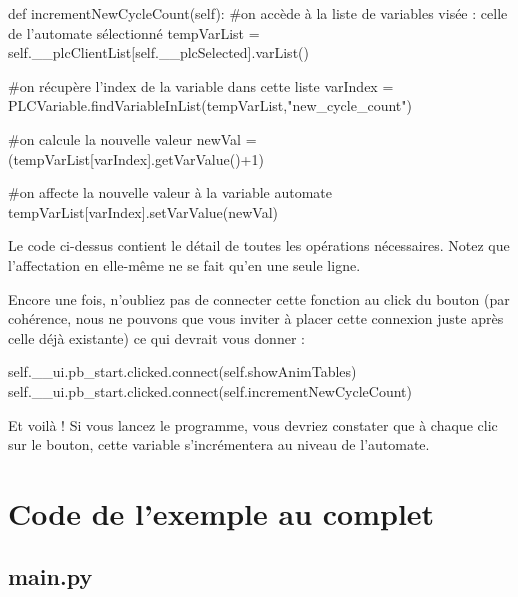 \begin{pyCode}
def incrementNewCycleCount(self):
	#on accède à la liste de variables visée : celle de l'automate sélectionné
	tempVarList = self.__plcClientList[self.__plcSelected].varList()

	#on récupère l'index de la variable dans cette liste
	varIndex = PLCVariable.findVariableInList(tempVarList,"new_cycle_count")

	#on calcule la nouvelle valeur
	newVal = (tempVarList[varIndex].getVarValue()+1)%

	#on affecte la nouvelle valeur à la variable automate
	tempVarList[varIndex].setVarValue(newVal)
\end{pyCode}
Le code ci-dessus contient le détail de toutes les opérations nécessaires.\newline
Notez que l'affectation en elle-même ne se fait qu'en une seule ligne.\smallSkip

Encore une fois, n'oubliez pas de connecter cette fonction au click du bouton (par cohérence, nous ne pouvons que vous inviter à placer cette connexion juste après celle déjà existante) ce qui devrait vous donner :
\begin{pyCode}
self.__ui.pb_start.clicked.connect(self.showAnimTables)
self.__ui.pb_start.clicked.connect(self.incrementNewCycleCount)
\end{pyCode}
\smallSkip

Et voilà ! Si vous lancez le programme, vous devriez constater que à chaque clic sur le bouton, cette variable s'incrémentera au niveau de l'automate.


\chapter{Code de l'exemple au complet}


\newpage
\section{main.py}

